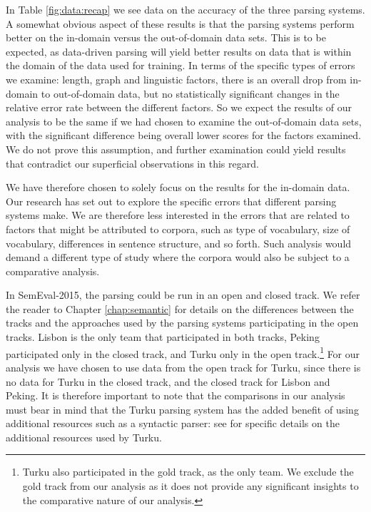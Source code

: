 In Table \ref{fig:data:recap} we see data on the accuracy of the three parsing systems. A somewhat obvious aspect of these results is that the parsing systems perform better on the in-domain versus the out-of-domain data sets. This is to be expected, as data-driven parsing will yield better results on data that is within the domain of the data used for training. In terms of the specific types of errors we examine: length, graph and linguistic factors, there is an overall drop from in-domain to out-of-domain data, but no statistically significant changes in the relative error rate between the different factors. So we expect the results of our analysis to be the same if we had chosen to examine the out-of-domain data sets, with the significant difference being overall lower scores for the factors examined. We do not prove this assumption, and further examination could yield results that contradict our superficial observations in this regard.

We have therefore chosen to solely focus on the results for the in-domain data. Our research has set out to explore the specific errors that different parsing systems make. We are therefore less interested in the errors that are related to factors that might be attributed to corpora, such as type of vocabulary, size of vocabulary, differences in sentence structure, and so forth. Such analysis would demand a different type of study where the corpora would also be subject to a comparative analysis.

In SemEval-2015, the parsing could be run in an open and closed track. We refer the reader to Chapter \ref{chap:semantic} for details on the differences between the tracks and the approaches used by the parsing systems participating in the open tracks. Lisbon is the only team that participated in both tracks, Peking participated only in the closed track, and Turku only in the open track.\footnote{Turku also participated in the gold track, as the only team. We exclude the gold track from our analysis as it does not provide any significant insights to the comparative nature of our analysis.} For our analysis we have chosen to use data from the open track for Turku, since there is no data for Turku in the closed track, and the closed track for Lisbon and Peking. It is therefore important to note that the comparisons in our analysis must bear in mind that the Turku parsing system has the added benefit of using additional resources such as a syntactic parser: see  for specific details on the additional resources used by Turku.

